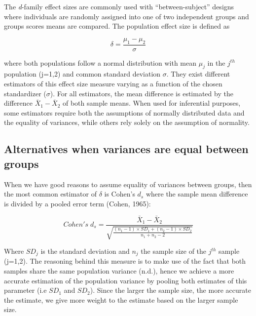 \documentclass[
  man,floatsintext]{apa6}
\begin{document}
The \emph{d}-family effect sizes are commonly used with \enquote{between-subject} designs where individuals are randomly assigned into one of two independent groups and groups scores means are compared. The population effect size is defined as

\begin{equation} 
\delta = \frac{\mu_{1}-\mu_{2}}{\sigma} 
\label{eq:Cohendelta}
\end{equation}

where both populations follow a normal distribution with mean \(\mu_j\) in the \(j^{th}\) population (j=1,2) and common standard deviation \(\sigma\). They exist different estimators of this effect size measure varying as a function of the chosen standardizer (\(\sigma\)). For all estimators, the mean difference is estimated by the difference \(\bar{X}_1-\bar{X}_2\) of both sample means. When used for inferential purposes, some estimators require both the assumptions of normally distributed data and the equality of variances, while others rely solely on the assumption of normality.

\hypertarget{alternatives-when-variances-are-equal-between-groups}{%
\subsection{Alternatives when variances are equal between groups}\label{alternatives-when-variances-are-equal-between-groups}}

When we have good reasons to assume equality of variances between groups, then the most common estimator of \(\delta\) is Cohen's \(d_{s}\) where the sample mean difference is divided by a pooled error term (Cohen, 1965):

\begin{equation} 
Cohen's \; d_s = \frac{\bar{X}_1-\bar{X}_2}{\sqrt{\frac{(n_1-1) \times SD_1+(n_2-1) \times SD_2}{n_1+n_2-2}}} 
\label{eq:Cohends}
\end{equation}

Where \(SD_j\) is the standard deviation and \(n_j\) the sample size of the \(j^{th}\) sample (j=1,2). The reasoning behind this measure is to make use of the fact that both samples share the same population variance (n.d.), hence we achieve a more accurate estimation of the population variance by pooling both estimates of this parameter (i.e \(SD_1\) and \(SD_2\)). Since the larger the sample size, the more accurate the estimate, we give more weight to the estimate based on the larger sample size.
\end{document}
